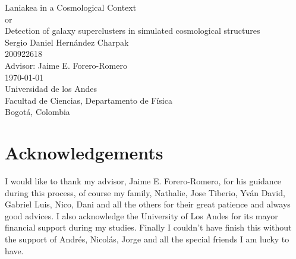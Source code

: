 \documentclass[12pt]{article}
\begin{document}
\begin{center}
\begin{figure}
\centering%
%
\end{figure}
\vspace{3 cm}
\FloatBarrier
\Huge
Laniakea in a Cosmological Context\\
\vspace{3 mm}
or\\
\vspace{3 mm}
Detection of galaxy superclusters in simulated cosmological structures\\  
\vspace{1 cm}
\vspace{3mm}
\Large Sergio Daniel Hern\'{a}ndez Charpak\\

\large
200922618\\
\vspace{1 cm}
\vspace{2mm}
\Large
Advisor: Jaime E. Forero-Romero\\

\normalsize
\vspace{2mm}
\vspace{1 cm}
\today \\
\vspace{1 cm}
\small 
Universidad de los Andes\\
Facultad de Ciencias, Departamento de F\'{i}sica\\
Bogot\'{a}, Colombia\\
\end{center}


\normalsize
\newpage
\section{Acknowledgements}

I would like to thank my advisor, Jaime E. Forero-Romero, for his guidance
 during this process, of course my family, Nathalie, Jose Tiberio, Yv\'{a}n David,
  Gabriel Luis, Nico, Dani and all the others for
   their great patience and always good advices. I
    also acknowledge the University of Los Andes
     for its mayor financial support during my
      studies. Finally I couldn't have finish this
       without the support of Andr\'{e}s,
        Nicol\'{a}s, Jorge and all the special
         friends I am lucky to have.


\newpage
\end{document}
